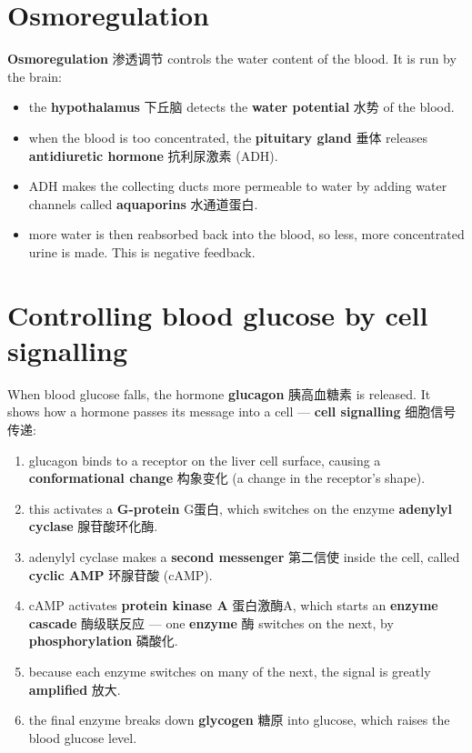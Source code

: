 \documentclass[11pt]{article}
\begin{document}
\section*{Osmoregulation}

\textbf{Osmoregulation} 渗透调节 controls the water content of the blood. It is run by the brain:

\begin{itemize}
\item the \textbf{hypothalamus} 下丘脑 detects the \textbf{water potential} 水势 of the blood.

\item when the blood is too concentrated, the \textbf{pituitary gland} 垂体 releases \textbf{antidiuretic hormone} 抗利尿激素 (ADH).

\item ADH makes the collecting ducts more permeable to water by adding water channels called \textbf{aquaporins} 水通道蛋白.

\item more water is then reabsorbed back into the blood, so less, more concentrated urine is made. This is negative feedback.

\end{itemize}

\section*{Controlling blood glucose by cell signalling}

When blood glucose falls, the hormone \textbf{glucagon} 胰高血糖素 is released. It shows how a hormone passes its message into a cell — \textbf{cell signalling} 细胞信号传递:

\begin{enumerate}
\item glucagon binds to a receptor on the liver cell surface, causing a \textbf{conformational change} 构象变化 (a change in the receptor's shape).

\item this activates a \textbf{G-protein} G蛋白, which switches on the enzyme \textbf{adenylyl cyclase} 腺苷酸环化酶.

\item adenylyl cyclase makes a \textbf{second messenger} 第二信使 inside the cell, called \textbf{cyclic AMP} 环腺苷酸 (cAMP).

\item cAMP activates \textbf{protein kinase A} 蛋白激酶A, which starts an \textbf{enzyme cascade} 酶级联反应 — one \textbf{enzyme} 酶 switches on the next, by \textbf{phosphorylation} 磷酸化.

\item because each enzyme switches on many of the next, the signal is greatly \textbf{amplified} 放大.

\item the final enzyme breaks down \textbf{glycogen} 糖原 into glucose, which raises the blood glucose level.

\end{enumerate}
\end{document}

